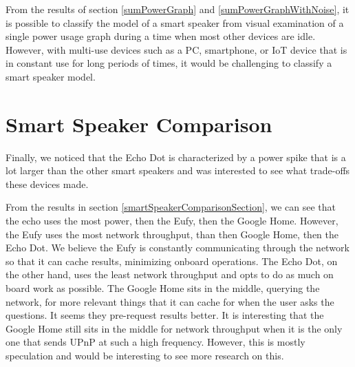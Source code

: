 From the results of section \ref{sumPowerGraph} and \ref{sumPowerGraphWithNoise}, it is possible to classify the model of a smart speaker from visual examination of a single power usage graph during a time when most other devices are idle. However, with multi-use devices such as a PC, smartphone, or IoT device that is in constant use for long periods of times, it would be challenging to classify a smart speaker model.

\section{Smart Speaker Comparison}
Finally, we noticed that the Echo Dot is characterized by a power spike that is a lot larger than the other smart speakers and was interested to see what trade-offs these devices made.

From the results in section \ref{smartSpeakerComparisonSection}, we can see that the echo uses the most power, then the Eufy, then the Google Home. However, the Eufy uses the most network throughput, than then Google Home, then the Echo Dot. We believe the Eufy is constantly communicating through the network so that it can cache results, minimizing onboard operations. The Echo Dot, on the other hand, uses the least network throughput and opts to do as much on board work as possible. The Google Home sits in the middle, querying the network, for more relevant things that it can cache for when the user asks the questions. It seems they pre-request results better. It is interesting that the Google Home still sits in the middle for network throughput when it is the only one that sends UPnP at such a high frequency. However, this is mostly speculation and would be interesting to see more research on this.